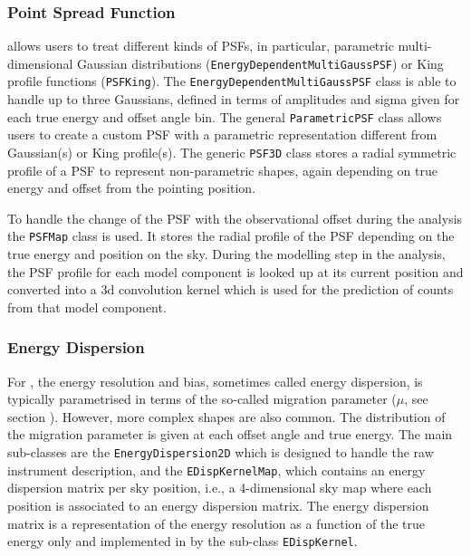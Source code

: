 \documentclass[longauth]{aa}
\newcommand{\code}[1]{\texttt{#1}}
\begin{document}
\subsubsection{Point Spread Function}
\gammapy allows users to treat different kinds of PSFs,
in particular, parametric multi-dimensional Gaussian distributions (\code{EnergyDependentMultiGaussPSF})
or King profile functions (\code{PSFKing}). The \code{EnergyDependentMultiGaussPSF}
class is able to handle up to three Gaussians, defined in terms of amplitudes and sigma given for each true energy
and offset angle bin. The general \code{ParametricPSF} class allows users to create a
custom PSF with a parametric representation different from Gaussian(s) or King profile(s).
The generic \code{PSF3D} class stores a radial symmetric profile of a
PSF to represent non-parametric shapes, again depending on true energy
and offset from the pointing position.

To handle the change of the PSF with the observational offset during the analysis 
the \code{PSFMap} class is used. It stores the radial profile of the PSF
depending on the true energy and position on the sky. During the modelling
step in the analysis, the PSF profile for each model component is 
looked up at its current position and converted into a 3d convolution kernel
which is used for the prediction of counts from that model component.


\subsubsection{Energy Dispersion}
For \iacts, the energy resolution and bias, sometimes called energy dispersion,
is typically parametrised in terms of the so-called
migration parameter ($\mu$, see section \label{sec:gammaray-data-analysis}).
 However, more complex
shapes are also common. The distribution of the migration parameter is given at each offset angle and
true energy. The main sub-classes are the \code{EnergyDispersion2D} which is
designed to handle the raw instrument description, and the \code{EDispKernelMap},
which contains an energy dispersion matrix per sky position, i.e., a 4-dimensional
sky map where each position is associated to an energy dispersion matrix.
The energy dispersion matrix is a representation of the energy resolution
as a function of the true energy only and implemented in \gammapy
by the sub-class \code{EDispKernel}.
\end{document}
